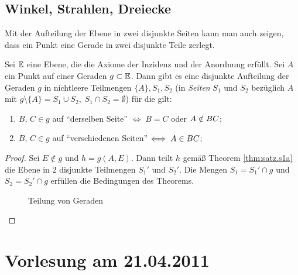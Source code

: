 
\subsection*{Winkel, Strahlen, Dreiecke}

Mit der Aufteilung der Ebene in zwei disjunkte Seiten kann man auch zeigen, dass ein Punkt eine
Gerade in zwei disjunkte Teile zerlegt.

\begin{thm}\label{thm:satz.s1b}
    Sei $\mathbb E$ eine Ebene, die die Axiome der Inzidenz und der Anordnung erfüllt. Sei $A$ ein Punkt
    auf einer Geraden $g \subset \mathbb E$. Dann gibt es eine disjunkte Aufteilung der Geraden $g$ in
    nichtleere Teilmengen $\{A\}, S_1, S_2$ (in {\em Seiten} $S_1$ und $S_2$ bezüglich $A$ mit $g
    \setminus \{A\} = S_1 \cup S_2,\; S_1 \cap S_2 = \emptyset$) für die gilt:
    \renewcommand{\labelenumi}{\alph{enumi})} %
    \begin{enumerate}
        \item $B,\, C \in g$ auf "`derselben Seite"' $\Longleftrightarrow\; B = C$ oder $A \notin
            {BC}$;

        \item $B,\, C \in g$ auf "`verschiedenen Seiten"' $\Longleftrightarrow\; A \in {BC}$;
    \end{enumerate}
\end{thm}

\begin{proof}
    Sei $E \notin g$ und $h = g(A,E)$. Dann teilt $h$ gemäß Theorem \ref{thm:satz.s1a} die Ebene in
    2 disjunkte Teilmengen $S_1'$ und $S_2'$. Die Mengen $S_1 = S_1'\cap g$ und $S_2 = S_2' \cap g$
    erfüllen die Bedingungen des Theorems.

    \begin{figure}[ht]
        
        \caption{Teilung von Geraden}
    \end{figure}
\end{proof}

\section*{Vorlesung am 21.04.2011}

